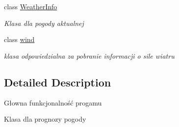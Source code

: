 \begin{DoxyCompactItemize}
class \mbox{\hyperlink{class_pogodynka__w57003_1_1_weather_info}{Weather\+Info}}
\begin{DoxyCompactList}\small\item\em Klasa dla pogody aktualnej \end{DoxyCompactList}\item 
class \mbox{\hyperlink{class_pogodynka__w57003_1_1wind}{wind}}
\begin{DoxyCompactList}\small\item\em klasa odpowiedzialna za pobranie informacji o sile wiatru \end{DoxyCompactList}\end{DoxyCompactItemize}


\subsection{Detailed Description}
Głowna funkcjonalność progamu 

Klasa dla prognozy pogody 